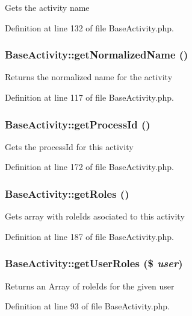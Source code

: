 Gets the activity name 

Definition at line 132 of file Base\-Activity.php.
\subsubsection{\setlength{\rightskip}{0pt plus 5cm}Base\-Activity::get\-Normalized\-Name ()}\label{classBaseActivity_a5}


Returns the normalized name for the activity 

Definition at line 117 of file Base\-Activity.php.
\subsubsection{\setlength{\rightskip}{0pt plus 5cm}Base\-Activity::get\-Process\-Id ()}\label{classBaseActivity_a16}


Gets the process\-Id for this activity 

Definition at line 172 of file Base\-Activity.php.
\subsubsection{\setlength{\rightskip}{0pt plus 5cm}Base\-Activity::get\-Roles ()}\label{classBaseActivity_a19}


Gets array with role\-Ids asociated to this activity 

Definition at line 187 of file Base\-Activity.php.
\subsubsection{\setlength{\rightskip}{0pt plus 5cm}Base\-Activity::get\-User\-Roles (\$ {\em user})}\label{classBaseActivity_a3}


Returns an Array of role\-Ids for the given user 

Definition at line 93 of file Base\-Activity.php.
